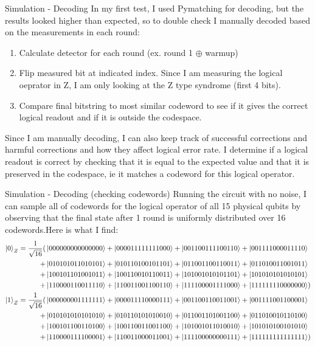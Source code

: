 \documentclass{beamer}
\begin{document}
\begin{frame}{Simulation - Decoding}
    In my first test, I used Pymatching for decoding, but the results looked higher than expected, so to double check I manually decoded based on the measurements in each round:
    \begin{enumerate}
        \item Calculate detector for each round (ex. round 1 $\oplus$ warmup) 
        \item Flip measured bit at indicated index. Since I am measuring the logical oeprator in Z, I am only looking at the Z type syndrome (first 4 bits).
        \item Compare final bitstring to most similar codeword to see if it gives the correct logical readout and if it is outside the codespace. 
    \end{enumerate}
    Since I am manually decoding, I can also keep track of successful corrections and harmful corrections and how they affect logical error rate. I determine if a logical readout is correct by checking that it is equal to the expected value and that it is preserved in the codespace, ie it matches a codeword for this logical operator.
\end{frame}

\begin{frame}{Simulation - Decoding (checking codewords)}
    Running the circuit with no noise, I can sample all of codewords for the logical operator of all 15 physical qubits by observing that the final state after 1 round is uniformly distributed over 16 codewords.Here is what I find:
    \tiny
    \begin{align*}
        \ket{0}_Z = \frac{1}{\sqrt{16}}(&\ket{000000000000000}+\ket{000011111111000}+\ket{001100111100110}+\ket{001111000011110}\\+&\ket{010101011010101}+\ket{010110100101101}+\ket{011001100110011}+\ket{011010011001011}\\+&\ket{100101101001011}+\ket{100110010110011}+\ket{101001010101101}+\ket{101010101010101}\\+&\ket{110000110011110}+\ket{110011001100110}+\ket{111100001111000}+\ket{111111110000000})
        \\\ket{1}_Z = \frac{1}{\sqrt{16}}(&\ket{000000001111111}+\ket{000011110000111}+\ket{001100110011001}+\ket{001111001100001}\\+&\ket{010101010101010}+\ket{010110101010010}+\ket{011001101001100}+\ket{011010010110100}\\+&\ket{100101100110100}+\ket{100110011001100}+\ket{101001011010010}+\ket{101010100101010}\\+&\ket{110000111100001}+\ket{110011000011001}+\ket{111100000000111}+\ket{111111111111111})
    \end{align*}
    \normalsize
\end{frame}
\end{document}
